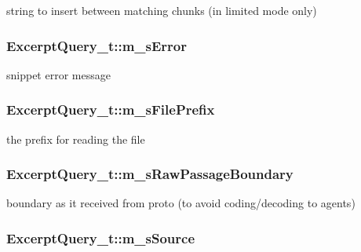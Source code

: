 string to insert between matching chunks (in limited mode only) 

\hypertarget{structExcerptQuery__t_a074979c7747d09bd010bd1b6e13593ad}{
\subsubsection[{m\-\_\-s\-Error}]{ Excerpt\-Query\-\_\-t\-::m\-\_\-s\-Error}}\label{structExcerptQuery__t_a074979c7747d09bd010bd1b6e13593ad}


snippet error message 

\hypertarget{structExcerptQuery__t_ab174f0187bb3b6cc6e0ca0d93802ac28}{
\subsubsection[{m\-\_\-s\-File\-Prefix}]{ Excerpt\-Query\-\_\-t\-::m\-\_\-s\-File\-Prefix}}\label{structExcerptQuery__t_ab174f0187bb3b6cc6e0ca0d93802ac28}


the prefix for reading the file 

\hypertarget{structExcerptQuery__t_a3ad07609a22cdb1c120716d497de024d}{
\subsubsection[{m\-\_\-s\-Raw\-Passage\-Boundary}]{ Excerpt\-Query\-\_\-t\-::m\-\_\-s\-Raw\-Passage\-Boundary}}\label{structExcerptQuery__t_a3ad07609a22cdb1c120716d497de024d}


boundary as it received from proto (to avoid coding/decoding to agents) 

\hypertarget{structExcerptQuery__t_a6d492e02492f9d8f09dc3d0adbae4b08}{
\subsubsection[{m\-\_\-s\-Source}]{ Excerpt\-Query\-\_\-t\-::m\-\_\-s\-Source}}\label{structExcerptQuery__t_a6d492e02492f9d8f09dc3d0adbae4b08}


